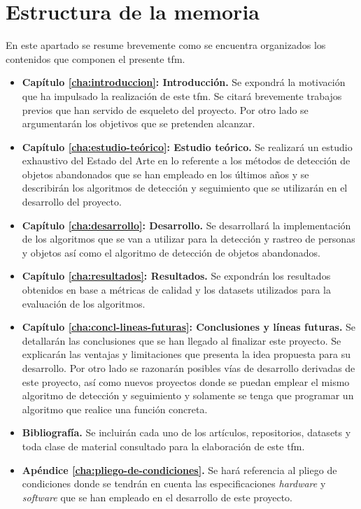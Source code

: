 \section{Estructura de la memoria}
\label{sec:estructura-memoria}
En este apartado se resume brevemente como se encuentra organizados los contenidos que componen el presente \gls{tfm}.

\begin{itemize}
    \item \textbf{Capítulo \ref{cha:introduccion}: Introducción.} Se expondrá la motivación que ha impulsado la realización de este \gls{tfm}. Se citará brevemente trabajos previos que han servido de esqueleto del proyecto. Por otro lado se argumentarán los objetivos que se pretenden alcanzar.
    \item \textbf{Capítulo \ref{cha:estudio-teórico}: Estudio teórico.} Se realizará un estudio exhaustivo del Estado del Arte en lo referente a los métodos de detección de objetos abandonados que se han empleado en los últimos años y se describirán los algoritmos de detección y seguimiento que se utilizarán en el desarrollo del proyecto.
    \item \textbf{Capítulo \ref{cha:desarrollo}: Desarrollo.} Se desarrollará la implementación de los algoritmos que se van a utilizar para la detección y rastreo de personas y objetos así como el algoritmo de detección de objetos abandonados.
    \item \textbf{Capítulo \ref{cha:resultados}: Resultados.} Se expondrán los resultados obtenidos en base a métricas de calidad y los datasets utilizados para la evaluación de los algoritmos.
    \item \textbf{Capítulo \ref{cha:concl-lineas-futuras}: Conclusiones y líneas futuras.} Se detallarán las conclusiones que se han llegado al finalizar este proyecto. Se explicarán las ventajas y limitaciones que presenta la idea propuesta para su desarrollo. Por otro lado se razonarán posibles vías de desarrollo derivadas de este proyecto, así como nuevos proyectos donde se puedan emplear el mismo algoritmo de detección y seguimiento y solamente se tenga que programar un algoritmo que realice una función concreta.
    \item \textbf{Bibliografía.} Se incluirán cada uno de los artículos, repositorios, datasets y toda clase de material consultado para la elaboración de este \gls{tfm}. 
    \item \textbf{Apéndice \ref{cha:pliego-de-condiciones}.} Se hará referencia al pliego de condiciones donde se tendrán en cuenta las especificaciones \textit{hardware} y \textit{software} que se han empleado en el desarrollo de este proyecto.

\end{itemize}
